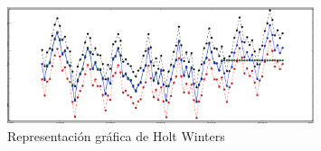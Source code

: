 \begin{figure}[H]
\vspace{1cm}
\centering
\includegraphics[width=0.8\textwidth]{imagenes/hw.png}
\caption{Representación gráfica de Holt Winters}
\end{figure}